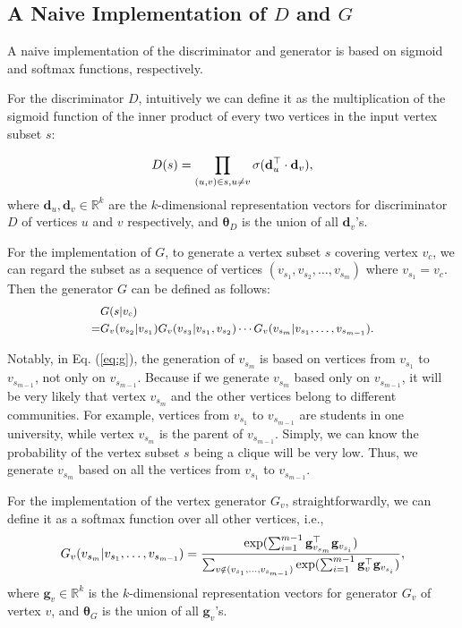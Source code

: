 \documentclass[sigconf]{acmart}
\begin{document}
\subsection{A Naive Implementation of $D$ and $G$}

A naive implementation of the discriminator and generator is based on sigmoid and softmax functions, respectively.

For the discriminator $D$, intuitively we can define it as the multiplication of the sigmoid function of the inner product of every two vertices in the input vertex subset $s$:

\begin{equation}
\label{eq:d(s)}
\small
  D(s)  = \prod_{(u,v) \in s, u \neq v}{\sigma(\mathbf{d}_u^\top  \cdot \mathbf{d}_v)},
\end{equation}
where $\mathbf{d}_u, \mathbf{d}_v \in \mathbb{R}^k$ are the $k$-dimensional representation vectors for discriminator $D$ of vertices $u$ and $v$ respectively, and $\mathbf{\theta}_D$ is the union of all $\mathbf{d}_v$'s.

For the implementation of $G$,
to generate a vertex subset $s$ covering vertex $v_c$, we can regard the subset as a sequence of vertices $(v_{s_1},v_{s_2},\ldots ,v_{s_m})$ where $v_{s_1}=v_c$.
Then the generator $G$ can be defined as follows:
\begin{equation}
  \small
  \label{eq:g}
  \begin{aligned}
    &G(s|v_c)  \\
    =&G_v(v_{s_2}|v_{s_1})G_v(v_{s_3}|v_{s_1},v_{s_2})\cdots G_v(v_{s_m}|v_{s_1},\ldots ,v_{s_{m-1}}).
  \end{aligned}
\end{equation}

Notably, in Eq. (\ref{eq:g}), the generation of $v_{s_m}$ is based on vertices from $v_{s_1}$ to $v_{s_{m-1}}$, not only on $v_{s_{m-1}}$.
Because if we generate $v_{s_{m}}$ based only on $v_{s_{m-1}}$, it will be very likely that vertex $v_{s_{m}}$ and the other vertices belong to different communities.
For example, vertices from $v_{s_{1}}$ to $v_{s_{m-1}}$ are students in one university, while vertex $v_{s_{m}}$ is the parent of $v_{s_{m-1}}$.
Simply, we can know the probability of the vertex subset $s$ being a clique will be very low.
Thus, we generate $v_{s_m}$ based on all the vertices from $v_{s_1}$ to $v_{s_{m-1}}$.

For the implementation of the vertex generator $G_v$, straightforwardly, we can define it as a softmax function over all other vertices, i.e.,
\begin{equation}
\label{eq:gv}
\small
  G_v(v_{s_m}|v_{s_1},\ldots ,v_{s_{m-1}}) = \frac{{\exp(\sum_{i=1}^{m-1}\mathbf{g}_{v_{s_m}}^\top \mathbf{g}_{v_{s_i}})}}{\sum_{v \notin (v_{s_1},\ldots ,v_{s_{m-1}})}{{\exp(\sum_{i=1}^{m-1}\mathbf{g}_v^\top \mathbf{g}_{v_{s_i}})}}},
\end{equation}
where $\mathbf{g}_v \in \mathbb{R}^k$ is the $k$-dimensional representation vectors for generator $G_v$ of vertex $v$, and $\mathbf{\theta}_G$ is the union of all $\mathbf{g}_v$'s.
\end{document}
